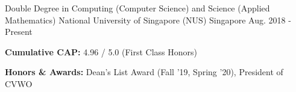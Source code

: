 

\begin{cventries}

  \cventry
    {Double Degree in Computing (Computer Science) and Science (Applied Mathematics)} %
    {National University of Singapore (NUS)} %
    {Singapore} %
    {Aug. 2018 - Present} %
    {
      \begin{cvitems} %
        \item {\textbf{Cumulative CAP:\hspace{1mm}} 4.96 / 5.0 (First Class Honors)}
        \item {\textbf{Honors \& Awards:\hspace{1mm}} Dean's List Award (Fall '19, Spring '20), President of CVWO}
      \end{cvitems}
    }

\end{cventries}
